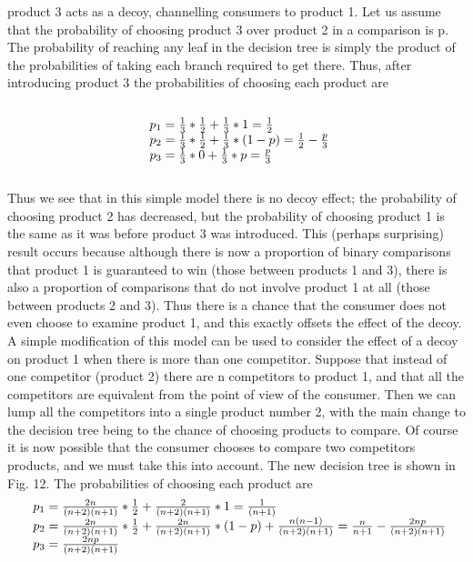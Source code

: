 product 3 acts as a decoy, channelling consumers to product 1. Let us assume that the probability of choosing
product 3 over product 2 in a comparison is p.\\
The probability of reaching any leaf in the decision tree is simply the product of the probabilities of
taking each branch required to get there.
Thus, after introducing product 3 the probabilities of choosing each product are~\cite{patel}\\
\\
\begin{equation} \label{eq:12}
\begin{array}{l@{}l}
p_1 = \frac{1}{3}*\frac{1}{2}+\frac{1}{3}*1 = \frac{1}{2} \\
p_2 = \frac{1}{3}*\frac{1}{2}+\frac{1}{3}*(1-p) = \frac{1}{2} - \frac{p}{3} \\
p_3 = \frac{1}{3}*0+\frac{1}{3}*p = \frac{p}{3}
\end{array}
\end{equation}
\\
Thus we see that in this simple model there is no decoy effect; the probability of choosing product 2 has decreased,
but the probability of choosing product 1 is the same as it was before product 3 was introduced.
This (perhaps surprising) result occurs because although there is now a proportion of binary comparisons
that product 1 is guaranteed to win (those between products 1 and 3), there is also a proportion of comparisons
that do not involve product 1 at all (those between products 2 and 3). Thus there is a chance that the consumer
does not even choose to examine product 1, and this exactly offsets the effect of the decoy.
A simple modification of this model can be used to consider the effect of a decoy on product 1 when
there is more than one competitor. Suppose that instead of one competitor (product 2) there are n competitors
to product 1, and that all the competitors are equivalent from the point of view of the consumer.
Then we can lump all the competitors into a single product number 2, with the main change to the decision tree
being to the chance of choosing products to compare. Of course it is now possible that the consumer
chooses to compare two competitors products, and we must take this into account. The new decision tree is shown in Fig. 12.
The probabilities of choosing each product are~\cite{patel}
\\
\begin{equation} \label{eq:13}
\begin{array}{l@{}l}
p_1 = \frac{2n}{(n+2)(n+1)}*\frac{1}{2}+\frac{2}{(n+2)(n+1)}*1 = \frac{1}{(n+1)} \\
p_2 = \frac{2n}{(n+2)(n+1)}*\frac{1}{2}+\frac{2n}{(n+2)(n+1)}*(1-p) + \frac{n(n-1)}{(n+2)(n+1)} = \frac{n}{n+1} - \frac{2np}{(n+2)(n+1)} \\
p_3 = \frac{2np}{(n+2)(n+1)}
\end{array}
\end{equation}
